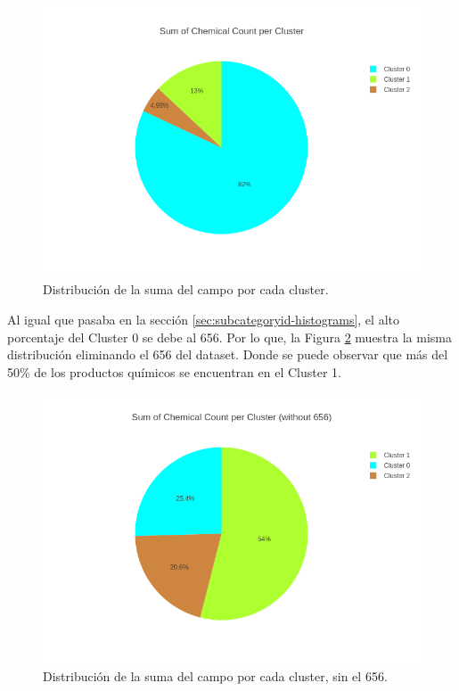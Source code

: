 \begin{figure}[!th]
\includegraphics[scale=0.46]{figures/pie-sum-chemicalcount}
\centering
\caption{Distribución de la suma del campo  por cada cluster.}
\label{fig:pie-sum-chemicalcount}
\end{figure}

Al igual que pasaba en la sección \ref{sec:subcategoryid-histograms}, el alto porcentaje del Cluster 0 se debe al  656. Por lo que, la Figura \ref{fig:pie-sum-chemicalcount-without656} muestra la misma distribución eliminando el  656 del dataset. Donde se puede observar que más del 50\% de los productos químicos se encuentran en el Cluster 1.

\begin{figure}[!th]
\includegraphics[scale=0.46]{figures/pie-sum-chemicalcount-without656}
\centering
\caption{Distribución de la suma del campo  por cada cluster, sin el  656.}
\label{fig:pie-sum-chemicalcount-without656}
\end{figure}

















\newpage









